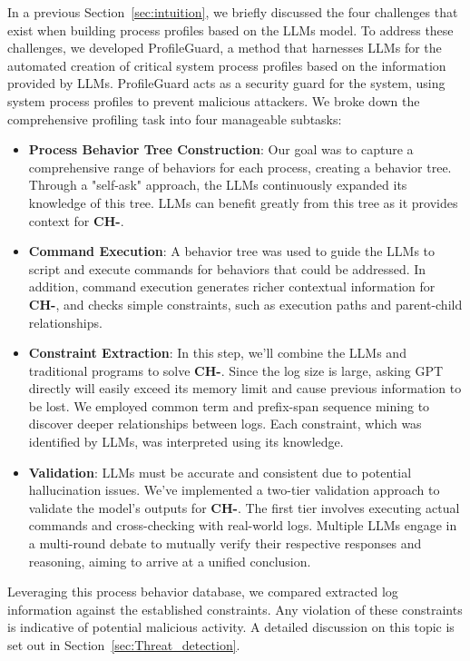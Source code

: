 In a previous Section~\ref{sec:intuition}, we briefly discussed the four challenges that exist when building process profiles based on the LLMs model. To address these challenges, we developed ProfileGuard, a method that harnesses LLMs for the automated creation of critical system process profiles based on the information provided by LLMs. ProfileGuard acts as a security guard for the system, using system process profiles to prevent malicious attackers.
We broke down the comprehensive profiling task into four manageable subtasks:
\begin{itemize}
    \item \textbf{Process Behavior Tree Construction}: Our goal was to capture a comprehensive range of behaviors for each process, creating a behavior tree. Through a "self-ask" approach, the LLMs continuously expanded its knowledge of this tree. LLMs can benefit greatly from this tree as it provides context for {\bf CH-}.
    \item \textbf{Command Execution}: A behavior tree was used to guide the LLMs to script and execute commands for behaviors that could be addressed. In addition, command execution generates richer contextual information for {\bf CH-}, and checks simple constraints, such as execution paths and parent-child relationships.
    \item \textbf{Constraint Extraction}:  In this step, we'll combine the LLMs and traditional programs to solve {\bf CH-}. Since the log size is large, asking GPT directly will easily exceed its memory limit and cause previous information to be lost. We employed common term and prefix-span sequence mining to discover deeper relationships between logs. Each constraint, which was identified by LLMs, was interpreted using its knowledge.
    \item \textbf{Validation}: LLMs must be accurate and consistent due to potential hallucination issues. We've implemented a two-tier validation approach to validate the model's outputs for {\bf CH-}. The first tier involves executing actual commands and cross-checking with real-world logs. Multiple LLMs engage in a multi-round debate to mutually verify their respective responses and reasoning, aiming to arrive at a unified conclusion.
\end{itemize}

Leveraging this process behavior database, we compared extracted log information against the established constraints. Any violation of these constraints is indicative of potential malicious activity.
A detailed discussion on this topic is set out in Section~\ref{sec:Threat_detection}. 






